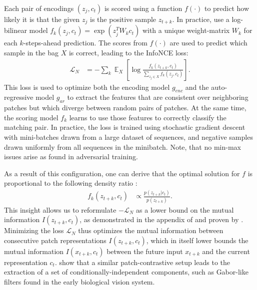 \documentclass{article}
\newcommand{\xtk}{x_{t+k}}
\newcommand{\ztk}{z_{t+k}}
\newcommand{\ct}{c_{t}}
\newcommand{\Wk}{W_{k}}
\newcommand{\fkzc}{f_{k}(\ztk, \ct)}
\newcommand{\loss}{\mathcal{L}_N}
\newcommand{\expectation}{\mathop{\mathbb{E}}}
\begin{document}
Each pair of encodings $(z_j, c_t)$ is scored using a function $f(\cdot)$ to predict how likely it is that the given $z_j$ is the positive sample $z_{t+k}$. In practice, \citet{oord2018representation} use a log-bilinear model $f_k(z_j, c_t) = \exp \left(z_j^T \Wk \ct\right)$
with a unique weight-matrix $\Wk$ for each $k$-steps-ahead prediction. The scores from $f(\cdot)$ are used to predict which sample in the bag $X$ is correct, leading to the InfoNCE loss:
\begin{align}\label{eq:infonce}
    \loss &= - \sum_k \expectation_X \left[ \log \frac{\fkzc}{\sum_{z_j \in X} f_k(z_j, \ct)} \right] .
\end{align}
This loss is used to optimize both the encoding model $g_{enc}$ and the auto-regressive model $g_{ar}$ to extract the features that are consistent over neighboring patches but which diverge between random pairs of patches. At the same time, the scoring model $f_k$ learns to use those features to correctly classify the matching pair. In practice, the loss is trained using stochastic gradient descent with mini-batches drawn from a large dataset of sequences, and negative samples drawn uniformly from all sequences in the minibatch. Note, that no min-max issues arise as found in adversarial training.

As a result of this configuration, one can derive that the optimal solution for $f$ is proportional to the following density ratio \citep{oord2018representation}:
\begin{align}
    \fkzc &\propto \frac{p(\ztk|\ct)}{p(\ztk)} . \label{eq:density_ratio}
\end{align}
This insight allows us to reformulate $-\loss$ as a lower bound on the mutual information $I(\ztk, \ct)$, as demonstrated in the appendix of \citet{oord2018representation} and proven by \citet{poolevariational}. Minimizing the loss $\loss$ thus optimizes the mutual information between consecutive patch representations $I(\ztk, \ct)$, which in itself lower bounds the mutual information $I(\xtk, \ct)$ between the future input $\xtk$ and the current representation $\ct$. \cite{hyvarinen2016unsupervised} show that a similar patch-contrastive setup leads to the extraction of a set of conditionally-independent components, such as Gabor-like filters found in the early biological vision system.
\end{document}
